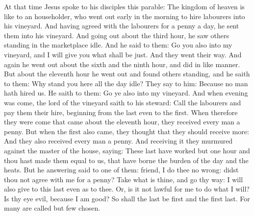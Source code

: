 At that time Jesus spoke to his disciples this parable:
The kingdom of heaven is like to an householder, who went out early in the
morning to hire labourers into his vineyard.  And having agreed with the
labourers for a penny a day, he sent them into his vineyard.  And going out
about the third hour, he saw others standing in the marketplace idle.  And he
said to them: Go you also into my vineyard, and I will give you what shall be
just.  And they went their way. And again he went out about the sixth and the
ninth hour, and did in like manner.  But about the eleventh hour he went out
and found others standing, and he saith to them: Why stand you here all the day
idle?  They say to him: Because no man hath hired us. He saith to them: Go ye
also into my vineyard.  And when evening was come, the lord of the vineyard
saith to his steward: Call the labourers and pay them their hire, beginning
from the last even to the first.  When therefore they were come that came about
the eleventh hour, they received every man a penny.  But when the first also
came, they thought that they should receive more: And they also received every
man a penny.  And receiving it they murmured against the master of the house,
saying: These last have worked but one hour and thou hast made them equal to
us, that have borne the burden of the day and the heats.  But he answering said
to one of them: friend, I do thee no wrong: didst thou not agree with me for a
penny?  Take what is thine, and go thy way: I will also give to this last even
as to thee.  Or, is it not lawful for me to do what I will? Is thy eye evil,
because I am good?   So shall the last be first and the first
last. For many are called but few chosen.






